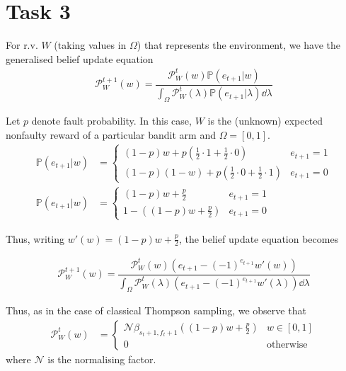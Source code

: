 \section*{Task 3}
For r.v. $W$ (taking values in $\Omega$) that represents the environment, we have the generalised belief update equation
\begin{align*}
    \mathcal{P}_W^{t + 1}(w) = \dfrac{\mathcal{P}_W^{t}(w)\mathbb{P}(e_{t+1} | w)}{\int_\Omega\mathcal{P}_W^{t}(\lambda)\mathbb{P}(e_{t+1} | \lambda)\dd\lambda}
\end{align*}

Let $p$ denote fault probability. In this case, $W$ is the (unknown) expected nonfaulty reward of a particular bandit arm and $\Omega=[0,1]$.
\begin{align*}
    \mathbb{P}(e_{t + 1} | w) &= \begin{cases}
        (1-p)w + p\left(\tfrac{1}{2}\cdot 1 + \tfrac{1}{2}\cdot 0\right) & e_{t+1} = 1 \\
        (1-p)(1 - w) + p\left(\tfrac{1}{2}\cdot 0 + \tfrac{1}{2}\cdot 1\right) & e_{t+1} = 0
    \end{cases} \\
    \mathbb{P}(e_{t + 1} | w) &= \begin{cases}
        (1-p)w + \tfrac{p}{2} & e_{t+1} = 1 \\
        1 - \left((1-p)w + \tfrac{p}{2}\right) & e_{t+1} = 0
    \end{cases}
\end{align*}

Thus, writing $w'(w) = (1-p)w + \tfrac{p}{2}$, the belief update equation becomes

\begin{align*}
    \mathcal{P}_W^{t + 1}(w) = \dfrac{\mathcal{P}_W^t(w)(e_{t+1} - (-1)^{e_{t+1}}w'(w))}{\int_\Omega\mathcal{P}_W^t(\lambda)(e_{t+1} - (-1)^{e_{t+1}}w'(\lambda))\dd\lambda}
\end{align*}

Thus, as in the case of classical Thompson sampling, we observe that
\begin{align*}
    \mathcal{P}_W^t(w) &= \begin{cases}
        \mathcal{N}\beta_{s_t+1,f_t+1}\left((1-p)w + \tfrac{p}{2}\right) & w\in[0,1] \\
        0 & \text{otherwise}
    \end{cases}
\end{align*}
where $\mathcal{N}$ is the normalising factor.

